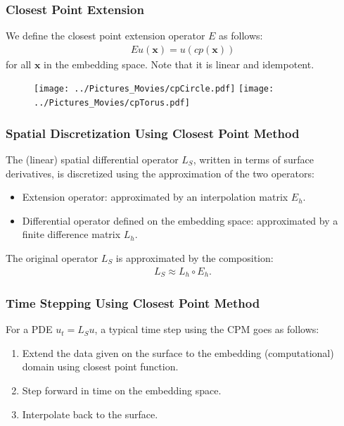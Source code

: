 \documentclass{beamer}
\begin{document}
%
%
%



\begin{frame}
\frametitle{Closest Point Extension} 

We define the closest point extension operator $E$ as follows:
\begin{gather*}
Eu(\mathbf x) = u(cp(\mathbf x)) 
\end{gather*}
for all $\mathbf x$ in the embedding space. Note that it is linear and idempotent.

\begin{figure}%
\centering
\texttt{[image: ../Pictures\_Movies/cpCircle.pdf]}
\texttt{[image: ../Pictures\_Movies/cpTorus.pdf]}
\end{figure}


\end{frame}

\begin{frame}
\frametitle{Spatial Discretization Using Closest Point Method}

The (linear) spatial differential operator $L_S$, written in terms of surface derivatives, is discretized using 
the approximation of the two operators:
\begin{itemize}
\item Extension operator: approximated by an interpolation matrix $E_h$.
\item Differential operator defined on the embedding space: approximated by a finite difference matrix $L_h$.
\end{itemize}
The original operator $L_S$ is approximated by the composition:
\begin{gather*}
L_S \approx L_h \circ E_h.
\end{gather*}



\end{frame}


\begin{frame}
\frametitle{Time Stepping Using Closest Point Method}

For a PDE $u_t = L_S u$, a typical time step using the CPM goes as follows:
\begin{enumerate}

\item Extend the data given on the surface to the embedding (computational) domain using closest point function.

\item Step forward in time on the embedding space.

\item Interpolate back to the surface.

\end{enumerate}

\end{frame}
\end{document}
